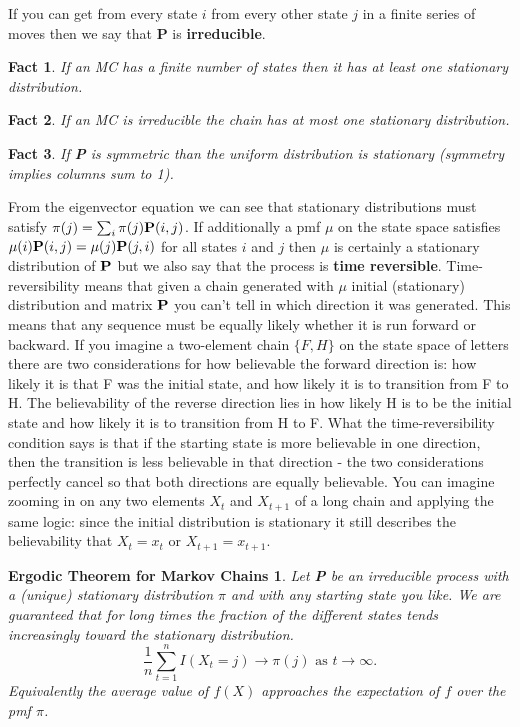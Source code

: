 If you can get from every state $i$ from every other state $j$ in a finite series of moves then we say that \textbf{P} is \textbf{irreducible}. 
\newtheorem{fact}{Fact} 
\begin{fact}
If an MC has a finite number of states then it has at least one stationary distribution.
\end{fact}
\begin{fact}
If an MC is irreducible the chain has at most one stationary distribution.
\end{fact}
\begin{fact}
If \textbf{P} is symmetric than the uniform distribution is stationary (symmetry implies columns sum to 1).
\end{fact}


From the eigenvector equation we can see that stationary distributions must satisfy $\pi(j) = \sum_i \pi(j)\bold{P}(i,j)$. If additionally a pmf $\mu$ on the state space satisfies $\mu(i)\bold{P}(i,j) = \mu(j)\bold{P}(j,i)$ for all states $i$ and $j$ then $\mu$ is certainly a stationary distribution of $\bold{P}$ but we also say that the process is \textbf{time reversible}. Time-reversibility means that given a chain generated with $\mu$ initial (stationary) distribution and matrix $\bold{P}$ you can't tell in which direction it was generated. This means that any sequence must be equally likely whether it is run forward or backward. If you imagine a two-element chain $\{F, H\}$ on the state space of letters there are two considerations for how believable the forward direction is: how likely it is that F was the initial state, and how likely it is to transition from F to H. The believability of the reverse direction lies in how likely H is to be the initial state and how likely it is to transition from H to F. What the time-reversibility condition says is that if the starting state is more believable in one direction, then the transition is less believable in that direction - the two considerations perfectly cancel so that both directions are equally believable. You can imagine zooming in on any two elements $X_t$ and $X_{t+1}$ of a long chain and applying the same logic: since the initial distribution is stationary it still describes the believability that $X_t = x_t$ or $X_{t+1} = x_{t+1}$.

\newtheorem{ergodic}{Ergodic Theorem for Markov Chains}
\begin{ergodic}
Let \textbf{P} be an irreducible process with a (unique) stationary distribution $\pi$ and with any starting state you like. We are guaranteed that for long times the fraction of the different states tends increasingly toward the stationary distribution.
\begin{equation}
\frac{1}{n}\sum_{t=1}^n I(X_t = j) \rightarrow \pi(j) \textrm{ as } t \rightarrow \infty.
\end{equation}
Equivalently the average value of $f(X)$ approaches the expectation of $f$ over the pmf $\pi$.
\end{ergodic}



